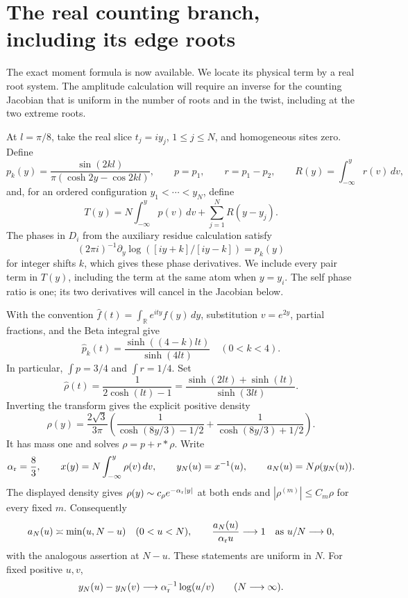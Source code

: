 \section{The real counting branch, including its edge roots}\label{sec:counting}

The exact moment formula is now available. We locate its physical term by a real root system. The amplitude calculation will require an inverse for the counting Jacobian that is uniform in the number of roots and in the twist, including at the two extreme roots.

At \(l=\pi/8\), take the real slice \(t_j=iy_j\), \(1\le j\le N\), and homogeneous sites zero. Define
\[
 p_k(y)=\frac{\sin(2kl)}{\pi(\cosh2y-\cos2kl)},\qquad
 p=p_1,\qquad r=p_1-p_2,\qquad
 R(y)=\int_{-\infty}^y r(v)\,dv,
\]
and, for an ordered configuration \(y_1<\cdots<y_N\), define
\[
 T(y)=N\int_{-\infty}^y p(v)\,dv+\sum_{j=1}^N R(y-y_j).
\]
The phases in \(D_i\) from the auxiliary residue calculation satisfy
\[
 (2\pi i)^{-1}\partial_y\log([iy+k]/[iy-k])=p_k(y)
\]
for integer shifts \(k\), which gives these phase derivatives. We include every pair term in \(T(y)\), including the term at the same atom when \(y=y_i\). The self phase ratio is one; its two derivatives will cancel in the Jacobian below.

With the convention \(\widehat f(t)=\int_{\mathbb R}e^{ity}f(y)\,dy\), substitution \(v=e^{2y}\), partial fractions, and the Beta integral give
\[
 \widehat p_k(t)=\frac{\sinh((4-k)lt)}{\sinh(4lt)}
 \quad(0<k<4).
\]
In particular, \(\int p=3/4\) and \(\int r=1/4\). Set
\[
 \widehat\rho(t)=\frac1{2\cosh(lt)-1}
 =\frac{\sinh(2lt)+\sinh(lt)}{\sinh(3lt)}.
\]
Inverting the transform gives the explicit positive density
\[
 \rho(y)=\frac{2\sqrt3}{3\pi}
 \left(\frac1{\cosh(8y/3)-1/2}
       +\frac1{\cosh(8y/3)+1/2}\right).
\]
It has mass one and solves \(\rho=p+r*\rho\). Write
\[
 \alpha_{\rm r}=\frac83,\qquad
 x(y)=N\int_{-\infty}^y\rho(v)\,dv,\qquad
 y_N(u)=x^{-1}(u),\qquad a_N(u)=N\rho(y_N(u)).
\]
The displayed density gives \(\rho(y)\sim c_\rho e^{-\alpha_{\rm r}|y|}\) at both ends and \(|\rho^{(m)}|\le C_m\rho\) for every fixed \(m\). Consequently
\begin{equation}\label{eq:quantile-density}
 a_N(u)\asymp\min(u,N-u)\quad(0<u<N),\qquad
 \frac{a_N(u)}{\alpha_{\rm r}u}\longrightarrow1
 \quad\hbox{as }u/N\longrightarrow0,
\end{equation}
with the analogous assertion at \(N-u\). These statements are uniform in \(N\). For fixed positive \(u,v\),
\[
 y_N(u)-y_N(v)\longrightarrow
 \alpha_{\rm r}^{-1}\log(u/v)\qquad(N\longrightarrow\infty).
\]


